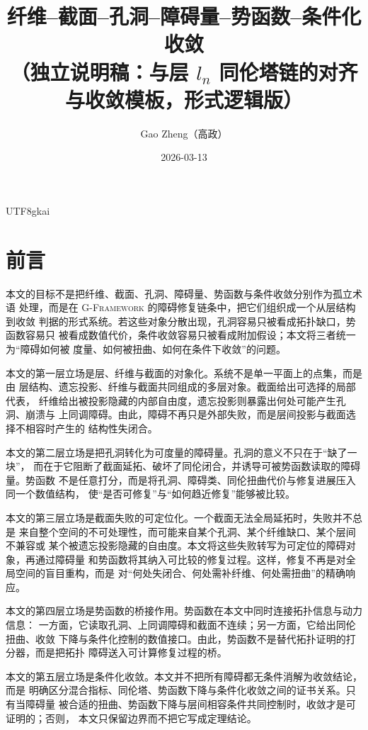 \documentclass[12pt]{article}
\newcommand{\GFramework}{\textsc{G-Framework}}
\begin{document}
\begin{CJK*}{UTF8}{gkai}

\title{纤维--截面--孔洞--障碍量--势函数--条件化收敛\\
（独立说明稿：与层 $l_n$ 同伦塔链的对齐与收敛模板，形式逻辑版）}
\newcommand{\CertificateAuthorCN}{Gao Zheng（高政）}
\author{\CertificateAuthorCN}
\date{2026-03-13}
\maketitle

\section*{前言}

本文的目标不是把纤维、截面、孔洞、障碍量、势函数与条件收敛分别作为孤立术语
处理，而是在 \GFramework{} 的障碍修复链条中，把它们组织成一个从层结构到收敛
判据的形式系统。若这些对象分散出现，孔洞容易只被看成拓扑缺口，势函数容易只
被看成数值代价，条件收敛容易只被看成附加假设；本文将三者统一为“障碍如何被
度量、如何被扭曲、如何在条件下收敛”的问题。

本文的第一层立场是层、纤维与截面的对象化。系统不是单一平面上的点集，而是由
层结构、遗忘投影、纤维与截面共同组成的多层对象。截面给出可选择的局部代表，
纤维给出被投影隐藏的内部自由度，遗忘投影则暴露出何处可能产生孔洞、崩溃与
上同调障碍。由此，障碍不再只是外部失败，而是层间投影与截面选择不相容时产生的
结构性失闭合。

本文的第二层立场是把孔洞转化为可度量的障碍量。孔洞的意义不只在于“缺了一块”，
而在于它阻断了截面延拓、破坏了同伦闭合，并诱导可被势函数读取的障碍量。势函数
不是任意打分，而是将孔洞、障碍类、同伦扭曲代价与修复进展压入同一个数值结构，
使“是否可修复”与“如何趋近修复”能够被比较。

本文的第三层立场是截面失败的可定位化。一个截面无法全局延拓时，失败并不总是
来自整个空间的不可处理性，而可能来自某个孔洞、某个纤维缺口、某个层间不兼容或
某个被遗忘投影隐藏的自由度。本文将这些失败转写为可定位的障碍对象，再通过障碍量
和势函数将其纳入可比较的修复过程。这样，修复不再是对全局空间的盲目重构，而是
对“何处失闭合、何处需补纤维、何处需扭曲”的精确响应。

本文的第四层立场是势函数的桥接作用。势函数在本文中同时连接拓扑信息与动力信息：
一方面，它读取孔洞、上同调障碍和截面不连续；另一方面，它给出同伦扭曲、收敛
下降与条件化控制的数值接口。由此，势函数不是替代拓扑证明的打分器，而是把拓扑
障碍送入可计算修复过程的桥。

本文的第五层立场是条件化收敛。本文并不把所有障碍都无条件消解为收敛结论，而是
明确区分混合指标、同伦塔、势函数下降与条件化收敛之间的证书关系。只有当障碍量
被合适的扭曲、势函数下降与层间相容条件共同控制时，收敛才是可证明的；否则，
本文只保留边界而不把它写成定理结论。


\end{CJK*}
\end{document}
